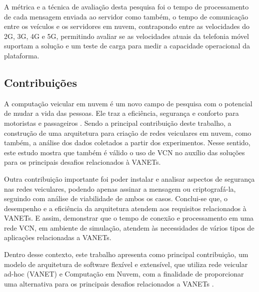\documentclass[
	12pt,				%
	oneside,			%
	a4paper,			%
	english,			%
	brazil				%
	]{abntex2ppgsi}
\begin{document}
A métrica e a técnica de avaliação desta pesquisa foi o tempo de processamento de cada mensagem enviada ao servidor como também, o tempo de comunicação entre os veículos e os servidores em nuvem, contrapondo entre as velocidades do 2G, 3G, 4G e 5G, permitindo avaliar se as velocidades atuais da telefonia móvel suportam a solução e um teste de carga para medir a capacidade operacional da plataforma.
 
\subsection{Contribuições}

A computação veicular em nuvem é um novo campo de pesquisa com o potencial de mudar a vida das pessoas. Ele  traz a eficiência, segurança e conforto para motoristas e passageiros \cite{falchetti2015vehicular}. Sendo a principal contribuição deste trabalho, a construção de uma arquitetura para criação de redes veiculares em nuvem, como também, a análise dos dados coletados a partir dos experimentos. Nesse sentido, este estudo mostra que também é válido o uso de VCN no auxílio das soluções para os principais desafios relacionados à VANETs.

Outra contribuição importante foi poder instalar e analisar aspectos de segurança nas redes veiculares, podendo apenas assinar a mensagem ou criptografá-la, seguindo com análise de viabilidade de ambos os casos. Conclui-se que, o desempenho e a eficiência da arquitetura atendem aos requisitos relacionados à VANETs. E assim, demonstrar que o tempo de conexão e processamento em uma rede VCN, em ambiente de simulação, atendem às necessidades de vários tipos de aplicações relacionadas a VANETs.

Dentro desse contexto, este trabalho apresenta como principal contribuição, um modelo de arquitetura de software flexível e extensível, que utiliza rede veicular ad-hoc (VANET) e  Computação em Nuvem, com a finalidade de proporcionar uma alternativa para os principais desafios relacionados a VANETs .
\end{document}
